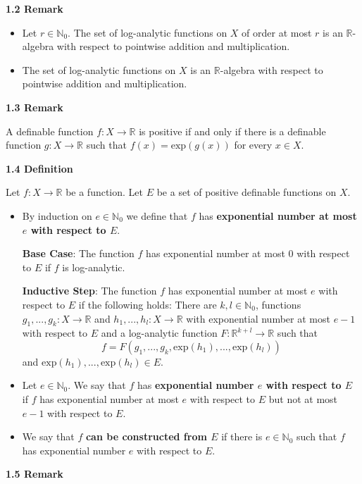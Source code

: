 \documentclass[12pt]{article}
\def\vs{\vspace}
\def\exp{\mathrm{exp}}
\begin{document}
\vs{0.3cm}
{\bf1.2 Remark}
\begin{itemize}
	\item [(1)] Let $r \in \mathbb{N}_0$. The set of log-analytic functions on $X$ of order at most $r$ is an $\mathbb{R}$-algebra with respect to pointwise addition and multiplication.
	\item [(2)] The set of log-analytic functions on $X$ is an $\mathbb{R}$-algebra with respect to pointwise addition and multiplication.
\end{itemize}

\vs{0.3cm}
{\bf1.3 Remark}

\vs{0.1cm}
A definable function $f:X \to \mathbb{R}$ is positive if and only if there is a definable function $g:X \to \mathbb{R}$ such that $f(x)=\exp(g(x))$ for every $x \in X$.

\vs{0.5cm}
{\bf1.4 Definition}

\vs{0.1cm}
Let $f:X \to \mathbb{R}$ be a function. Let $E$ be a set of positive definable functions on $X$.
\begin{itemize}
	\item [(a)] By induction on $e \in \mathbb{N}_0$ we define that $f$ has \textbf{exponential number at most $e$ with respect to $E$}.
	
	\vs{0.2cm}
	{\bf Base Case}: The function $f$ has exponential number at most $0$ with respect to $E$ if $f$ is log-analytic.
	
	\vs{0.2cm}
	{\bf Inductive Step}: The function $f$ has exponential number at most $e$ with respect to $E$ if the following holds: There are $k,l \in \mathbb{N}_0$, functions $g_1,...,g_k:X \to \mathbb{R}$ and $h_1,...,h_l:X \to \mathbb{R}$ with exponential number at most $e-1$ with respect to $E$ and a log-analytic function $F:\mathbb{R}^{k+l} \to \mathbb{R}$ such that
	$$f=F(g_1,...,g_k,\exp(h_1),...,\exp(h_l))$$
	and $\exp(h_1),...,\exp(h_l) \in E$.
	
	\item [(b)] Let $e \in \mathbb{N}_0$. We say that $f$ has \textbf{exponential number $e$ with respect to $E$} if $f$ has exponential number at most $e$ with respect to $E$ but not at most $e-1$ with respect to $E$.
	
	\item [(c)] We say that $f$ \textbf{can be constructed from $E$} if there is $e \in \mathbb{N}_0$ such that $f$ has exponential number $e$ with respect to $E$. 
\end{itemize}

\vs{0.5cm}
{\bf1.5 Remark}
\end{document}

